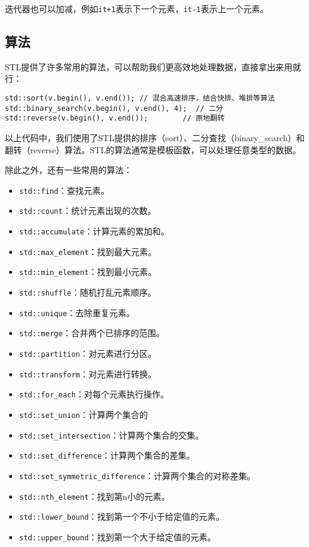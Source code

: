 \documentclass[../main.tex]{subfiles}
\begin{document}
迭代器也可以加减，例如\texttt{it+1}表示下一个元素，\texttt{it-1}表示上一个元素。

\subsection{算法}
STL提供了许多常用的算法，可以帮助我们更高效地处理数据，直接拿出来用就行：
\begin{lstlisting}
std::sort(v.begin(), v.end()); // 混合高速排序，结合快排、堆排等算法
std::binary_search(v.begin(), v.end(), 4);  // 二分
std::reverse(v.begin(), v.end());        // 原地翻转
\end{lstlisting}

以上代码中，我们使用了STL提供的排序（sort）、二分查找（binary\_search）和翻转（reverse）算法。STL的算法通常是模板函数，可以处理任意类型的数据。

除此之外，还有一些常用的算法：
\begin{itemize}
  \item \texttt{std::find}：查找元素。
  \item \texttt{std::count}：统计元素出现的次数。
  \item \texttt{std::accumulate}：计算元素的累加和。
  \item \texttt{std::max\_element}：找到最大元素。
  \item \texttt{std::min\_element}：找到最小元素。
  \item \texttt{std::shuffle}：随机打乱元素顺序。
  \item \texttt{std::unique}：去除重复元素。
  \item \texttt{std::merge}：合并两个已排序的范围。
  \item \texttt{std::partition}：对元素进行分区。
  \item \texttt{std::transform}：对元素进行转换。
  \item \texttt{std::for\_each}：对每个元素执行操作。
  \item \texttt{std::set\_union}：计算两个集合的
  \item \texttt{std::set\_intersection}：计算两个集合的交集。
  \item \texttt{std::set\_difference}：计算两个集合的差集。
  \item \texttt{std::set\_symmetric\_difference}：计算两个集合的对称差集。
  \item \texttt{std::nth\_element}：找到第n小的元素。
  \item \texttt{std::lower\_bound}：找到第一个不小于给定值的元素。
  \item \texttt{std::upper\_bound}：找到第一个大于给定值的元素。
\end{itemize}
\end{document}

